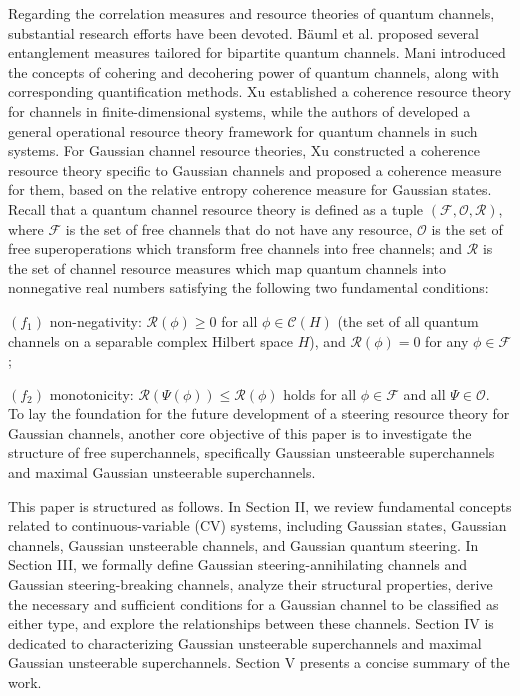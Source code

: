 \documentclass[10pt,aps,pra,amsfonts,amssymb,amsmath,%
floatfix,nofootinbib, groupedaddress,superscriptaddress,citesort,twocolumn
]{revtex4}%
\begin{document}
Regarding the correlation measures and resource theories of quantum channels, substantial research efforts have been devoted. Bäuml et al. \cite{BDW} proposed several entanglement measures tailored for bipartite quantum channels. Mani \cite{MK} introduced the concepts of cohering and decohering power of quantum channels, along with corresponding quantification methods. Xu \cite{X19} established a coherence resource theory for channels in finite-dimensional systems, while the authors of \cite{YX1} developed a general operational resource theory framework for quantum channels in such systems. For Gaussian channel resource theories, Xu \cite{X11} constructed a coherence resource theory specific to Gaussian channels and proposed a coherence measure for them, based on the relative entropy coherence measure for Gaussian states.
Recall that a quantum channel
 resource theory is defined as a tuple $(\mathcal F,\mathcal O,\mathcal R)$, where $\mathcal F$ is the set of free
 channels  that do not have any
 resource, $\mathcal O$ is the set of  free superoperations  which transform free channels into free channels; and  $\mathcal R$  is the set of  channel resource measures which map quantum channels into  nonnegative real numbers satisfying the following two fundamental conditions:

$( f_1)$ non-negativity: $\mathcal R\left( \phi  \right) \ge 0$ for all $\phi  \in \mathcal C(H)$ (the set of all quantum channels on a separable complex Hilbert space $H$),  and
 $\mathcal R\left( \phi  \right)=0$ for any $\phi \in {\mathcal F}$;

$ (f_2)$ monotonicity: $\mathcal R\left( {\Psi\left( \phi
 	\right)} \right) \le \mathcal R\left( \phi \right)$ holds for all $\phi  \in
 {\mathcal F}$ and all $\Psi\in
 {\mathcal O}$. \\
To lay the foundation for the future development of a steering resource theory for Gaussian channels, another core objective of this paper is to investigate the structure of free superchannels, specifically Gaussian unsteerable superchannels and maximal Gaussian unsteerable superchannels.


This paper is structured as follows. In Section II, we review fundamental concepts related to continuous-variable (CV) systems, including Gaussian states, Gaussian channels, Gaussian unsteerable channels, and Gaussian quantum steering. In Section III, we formally define Gaussian steering-annihilating channels and Gaussian steering-breaking channels, analyze their structural properties, derive the necessary and sufficient conditions for a Gaussian channel to be classified as either type, and explore the relationships between these  channels. Section IV is dedicated to characterizing Gaussian unsteerable superchannels and maximal Gaussian unsteerable superchannels. Section V presents a concise summary of the work.
\end{document}
